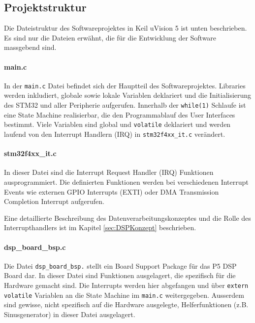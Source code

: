 \subsection{Projektstruktur}
\label{sec:SWProjekt}

Die Dateistruktur des Softwareprojektes in Keil uVision 5 ist unten beschrieben. 
Es sind nur die Dateien erwähnt, die für die Entwicklung der Software massgebend sind.

\paragraph{main.c}

In der \texttt{main.c} Datei befindet sich der Hauptteil des Softwareprojektes.
Libraries werden inkludiert, globale sowie lokale Variablen deklariert und die Initialisierung des STM32 und aller Peripherie aufgerufen.
Innerhalb der \texttt{while(1)} Schlaufe ist eine State Machine realisierbar, die den Programmablauf des User Interfaces bestimmt.
Viele Variablen sind global und \texttt{volatile} deklariert und werden laufend von den Interrupt Handlern (IRQ) in \texttt{stm32f4xx\_it.c} verändert.


\paragraph{stm32f4xx\_it.c}

In dieser Datei sind die Interrupt Request Handler (IRQ) Funktionen ausprogrammiert.
Die definierten Funktionen werden bei verschiedenen Interrupt Events wie externen GPIO Interrupts (EXTI) oder DMA Transmission Completion Interrupt aufgerufen.

Eine detaillierte Beschreibung des Datenverarbeitungskonzeptes und die Rolle des Interrupthandlers ist im Kapitel \ref{sec:DSPKonzept} beschrieben.

\paragraph{dsp\_board\_bsp.c}

Die Datei \texttt{dsp\_board\_bsp.} stellt ein Board Support Package für das P5 DSP Board dar.
In dieser Datei sind Funktionen ausgelagert, die spezifisch für die Hardware gemacht sind.
Die Interrupts werden hier abgefangen und über \texttt{extern volatile} Variablen an die State Machine im \texttt{main.c} weitergegeben.
Ausserdem sind gewisse, nicht spezifisch auf die Hardware ausgelegte, Helferfunktionen (z.B. Sinusgenerator) in dieser Datei ausgelagert.

